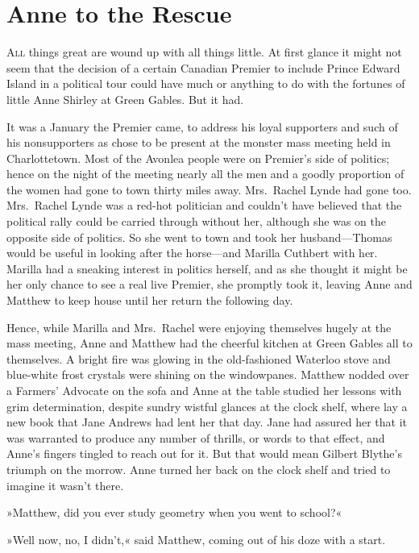 \chapter{Anne to the Rescue}
	
\lettrine[lines=4]{A}{ll} things great are wound up with all things little. At first glance it might not seem that the decision of a certain Canadian Premier to include Prince Edward Island in a political tour could have much or anything to do with the fortunes of little Anne Shirley at Green Gables. But it had.

It was a January the Premier came, to address his loyal supporters and such of his nonsupporters as chose to be present at the monster mass meeting held in Charlottetown. Most of the Avonlea people were on Premier's side of politics; hence on the night of the meeting nearly all the men and a goodly proportion of the women had gone to town thirty miles away. Mrs.~Rachel Lynde had gone too. Mrs.~Rachel Lynde was a red-hot politician and couldn't have believed that the political rally could be carried through without her, although she was on the opposite side of politics. So she went to town and took her husband—Thomas would be useful in looking after the horse—and Marilla Cuthbert with her. Marilla had a sneaking interest in politics herself, and as she thought it might be her only chance to see a real live Premier, she promptly took it, leaving Anne and Matthew to keep house until her return the following day.

Hence, while Marilla and Mrs.~Rachel were enjoying themselves hugely at the mass meeting, Anne and Matthew had the cheerful kitchen at Green Gables all to themselves. A bright fire was glowing in the old-fashioned Waterloo stove and blue-white frost crystals were shining on the windowpanes. Matthew nodded over a Farmers' Advocate on the sofa and Anne at the table studied her lessons with grim determination, despite sundry wistful glances at the clock shelf, where lay a new book that Jane Andrews had lent her that day. Jane had assured her that it was warranted to produce any number of thrills, or words to that effect, and Anne's fingers tingled to reach out for it. But that would mean Gilbert Blythe's triumph on the morrow. Anne turned her back on the clock shelf and tried to imagine it wasn't there.

»Matthew, did you ever study geometry when you went to school?«

»Well now, no, I didn't,« said Matthew, coming out of his doze with a start.

